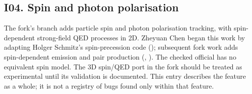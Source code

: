 \subsection*{I04. Spin and photon polarisation}
\label{imp:I04}
The fork's \href{https://github.com/ZheyuanChen/epoch_dev/tree/spin}{}
branch adds particle spin and photon polarisation tracking,
with spin-dependent strong-field QED processes in 2D. Zheyuan
Chen began this work by adapting Holger Schmitz's spin-precession
code (); subsequent fork work adds
spin-dependent emission and pair production
(, ).
The checked official  has no equivalent spin model.
The 3D spin/QED port in the fork should be treated as
experimental until its validation is documented. This entry
describes the feature as a whole; it is not a registry of
bugs found only within that feature.
